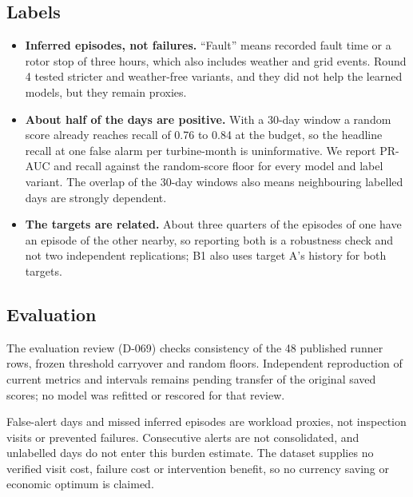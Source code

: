 \documentclass[12pt,a4paper]{article}
\begin{document}
	\subsection{Labels}
	\begin{itemize}
		\item \textbf{Inferred episodes, not failures.} ``Fault'' means recorded fault time or a rotor stop of three hours, which also includes weather and grid events. Round 4 tested stricter and weather-free variants, and they did not help the learned models, but they remain proxies.
		\item \textbf{About half of the days are positive.} With a 30-day window a random score already reaches recall of 0.76 to 0.84 at the budget, so the headline recall at one false alarm per turbine-month is uninformative. We report PR-AUC and recall against the random-score floor for every model and label variant. The overlap of the 30-day windows also means neighbouring labelled days are strongly dependent.
		\item \textbf{The targets are related.} About three quarters of the episodes of one have an episode of the other nearby, so reporting both is a robustness check and not two independent replications; B1 also uses target A's history for both targets.
	\end{itemize}

	\subsection{Evaluation}
    The evaluation review (D-069) checks consistency of the 48 published runner rows,
    frozen threshold carryover and random floors. Independent reproduction of current
    metrics and intervals remains pending transfer of the original saved scores;
    no model was refitted or rescored for that review.

    False-alert days and missed inferred episodes are workload proxies, not inspection
    visits or prevented failures. Consecutive alerts are not consolidated, and unlabelled
    days do not enter this burden estimate. The dataset supplies no verified visit cost,
    failure cost or intervention benefit, so no currency saving or economic optimum is claimed.
\end{document}
